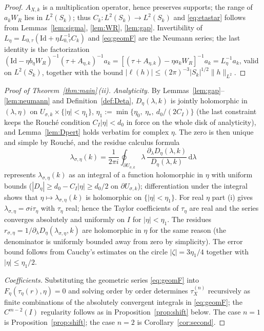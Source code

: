 \documentclass[11pt,a4paper]{amsart}
\theoremstyle{definition}
\theoremstyle{remark}
\newcommand{\Id}{\mathrm{Id}}
\newcommand{\dd}{\,\mathrm{d}}
\newcommand{\ellf}{\ell}
\begin{document}
\begin{proof}
$A_{X,k}$ is a multiplication operator, hence preserves supports; the range of $a_kW_R$ lies in $L^2(S_k)$; thus $C_k:L^2(S_k)\to L^2(S_k)$ and \eqref{eq:etastar} follows from Lemmas~\ref{lem:sigma}, \ref{lem:WR}, \ref{lem:gap}. Invertibility of $L_\eta=L_{0,\tau}(\Id+\eta L_{0,\tau}^{-1}C_k)$ and \eqref{eq:geomF} are the Neumann series; the last identity is the factorization
$(\Id-\eta b_\eta W_R)^{-1}(\tau+A_{\eta,k})^{-1}a_k=[(\tau+A_{\eta,k})-\eta a_kW_R]^{-1}a_k=L_\eta^{-1}a_k$,
valid on $L^2(S_k)$, together with the bound $|\ellf(h)|\le(2\pi)^{-3}|S_k|^{1/2}\|h\|_{L^2}$.
\end{proof}

\begin{proof}[Proof of Theorem~\ref{thm:main}\,(ii)]
\emph{Analyticity.} By Lemmas~\ref{lem:gap}--\ref{lem:neumann} and Definition~\ref{def:Deta}, $D_\eta(\lambda,k)$ is jointly holomorphic in $(\lambda,\eta)$ on $U_{\sigma,k}\times\{|\eta|<\eta_1\}$, $\eta_1:=\min\{\eta_0,\ \eta_*,\ d_0/(2C_I)\}$ (the last constraint keeps the Rouch\'e condition $C_I|\eta|<d_0$ in force on the whole disk of analyticity), and Lemma~\ref{lem:Dpert} holds verbatim for complex $\eta$. The zero is then unique and simple by Rouch\'e, and the residue calculus formula
\begin{equation}\label{eq:contour}
\lambda_{\sigma,\eta}(k)=\frac1{2\pi i}\oint_{\partial U_{\sigma,k}}\lambda\,\frac{\partial_\lambda D_\eta(\lambda,k)}{D_\eta(\lambda,k)}\dd\lambda
\end{equation}
represents $\lambda_{\sigma,\eta}(k)$ as an integral of a function holomorphic in $\eta$ with uniform bounds ($|D_\eta|\ge d_0-C_I|\eta|\ge d_0/2$ on $\partial U_{\sigma,k}$); differentiation under the integral shows that $\eta\mapsto\lambda_{\sigma,\eta}(k)$ is holomorphic on $\{|\eta|<\eta_1\}$. For real $\eta$ part (i) gives $\lambda_{\sigma,\eta}=\sigma i\tau_\eta$ with $\tau_\eta$ real; hence the Taylor coefficients of $\tau_\eta$ are real and the series converges absolutely and uniformly on $I$ for $|\eta|<\eta_1$. The residues $r_{\sigma,\eta}=1/\partial_\lambda D_\eta(\lambda_{\sigma,\eta},k)$ are holomorphic in $\eta$ for the same reason (the denominator is uniformly bounded away from zero by simplicity). The error bound follows from Cauchy's estimates on the circle $|\zeta|=3\eta_1/4$ together with $|\eta|\le\eta_1/2$.

\emph{Coefficients.} Substituting the geometric series \eqref{eq:geomF} into $F_\eta(\tau_\eta(r),\eta)=0$ and solving order by order determines $\tau_X^{(n)}$ recursively as finite combinations of the absolutely convergent integrals in \eqref{eq:geomF}; the $C^{m-2}(I)$ regularity follows as in Proposition~\ref{prop:shift} below. The case $n=1$ is Proposition~\ref{prop:shift}; the case $n=2$ is Corollary~\ref{cor:second}.
\end{proof}
\end{document}
